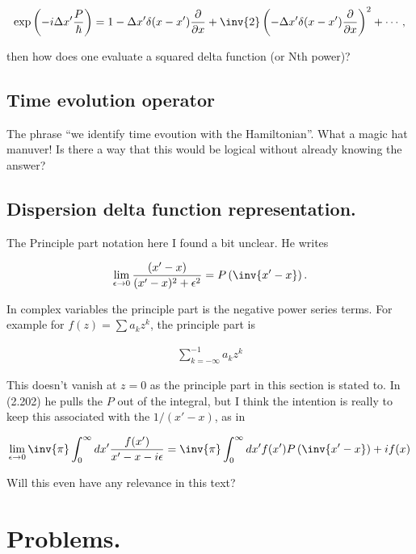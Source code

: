 \begin{align*}
\exp\left( -i \Delta x' \frac{P}{\hbar} \right) = 
1 - \Delta x' \delta(x -x') \frac{\partial}{\partial x} + 
\inv{2} \left( - \Delta x' \delta(x -x') \frac{\partial}{\partial x} \right)^2 + \cdots,
\end{align*}

then how does one evaluate a squared delta function (or Nth power)?

\subsection{Time evolution operator}

The phrase ``we identify time evoution with the Hamiltonian''.  What a magic hat manuver!  Is there a way that this would be logical without already knowing the answer?

\subsection{Dispersion delta function representation.}

The Principle part notation here I found a bit unclear.  He writes

\begin{align*}
\lim_{\epsilon \rightarrow 0} 
\frac{(x'-x)}{(x'-x)^2 + \epsilon^2}
= 
P\left( \inv{x' - x} \right).
\end{align*}

In complex variables the principle part is the negative power series terms.  For example for $f(z) = \sum a_k z^k$, the principle part is

\begin{align*}
\sum_{k = -\infty}^{-1} a_k z^k
\end{align*}

This doesn't vanish at $z = 0$ as the principle part in this section is stated to.  In (2.202) he pulls the $P$ out of the integral, but I think the intention is really to keep this associated with the $1/(x'-x)$, as in

\begin{align*}
\lim_{\epsilon \rightarrow 0} 
\inv{\pi} \int_0^\infty dx' \frac{f(x')}{x'-x - i \epsilon}
= 
\inv{\pi} \int_0^\infty dx' f(x') P\left( \inv{x' - x} \right) + i f(x)
\end{align*}

Will this even have any relevance in this text?

\section{Problems.}
